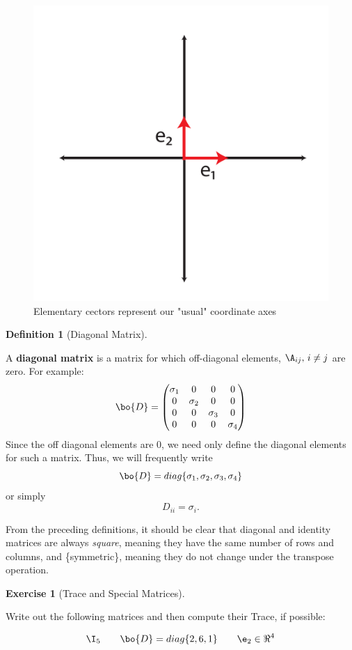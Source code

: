 \documentclass[
]{article}
\theoremstyle{definition}
\newtheorem{definition}{Definition}[section]
\theoremstyle{definition}
\theoremstyle{definition}
\newtheorem{exercise}{Exercise}[section]
\theoremstyle{definition}
\theoremstyle{remark}
\begin{document}
\begin{figure}

{\centering \includegraphics[width=0.5\linewidth]{figs/elemvectors} 

}

\caption{Elementary cectors represent our "usual" coordinate axes}\label{fig:elemvectors}
\end{figure}

\begin{definition}[Diagonal Matrix]
\protect\hypertarget{def:diag}{}\label{def:diag}

A \textbf{diagonal matrix} is a matrix for which off-diagonal elements, \(\A_{ij},\,i\ne j\) are zero.
For example:
\[\bo{D} = \left(\begin{matrix} \sigma_1 & 0 & 0 & 0 \\
                        0 & \sigma_2 & 0 & 0\\
                        0&0&\sigma_3&0\\
                        0&0&0&\sigma_4 \end{matrix}\right)\]
Since the off diagonal elements are 0, we need only define the diagonal elements for such a matrix. Thus, we will frequently write
\[\bo{D}=diag\{\sigma_1,\sigma_2,\sigma_3,\sigma_4\}\]
or simply \[D_{ii} = \sigma_i.\]

\end{definition}

From the preceding definitions, it should be clear that diagonal and identity matrices are always \emph{square}, meaning they have the same number of rows and columns, and \{symmetric\}, meaning they do not change under the transpose operation.

\begin{exercise}[Trace and Special Matrices]
\protect\hypertarget{exr:traceexer}{}\label{exr:traceexer}

Write out the following matrices and then compute their Trace, if possible:

\[\I_5 \qquad \bo{D}=diag\{2,6,1\} \qquad \e_2 \in \Re^4\]
\vspace{1.5cm}

\end{exercise}
\end{document}
